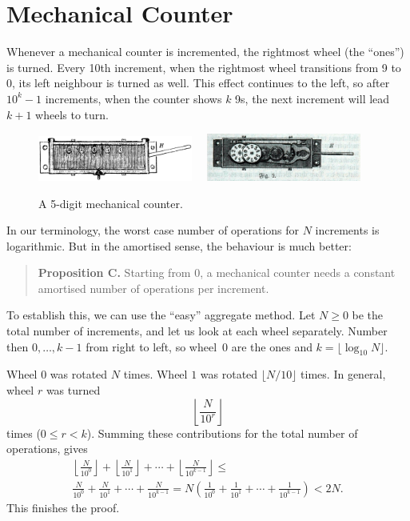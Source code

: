 \documentclass{tufte-handout}
\begin{document}
\section{Mechanical Counter}

Whenever a mechanical counter is incremented, the rightmost wheel (the
``ones'') is turned. Every 10th increment, when the rightmost wheel
transitions from 9 to 0, its left neighbour is turned as well. This
effect continues to the left, so after $10^k-1$ increments, when the
counter shows $k$ 9s, the next increment will lead $k+1$ wheels to
turn.

\begin{figure}[htb]
\centerline{\includegraphics[width=2in]{Zaehlwerk_Schema_1.jpg}
$\quad$\includegraphics[width=2in]{Zaehlwerk_Schema_2.jpg}}
\caption{A 5-digit mechanical counter.}
\end{figure}

In our terminology, the worst case number of operations for $N$
increments is logarithmic. But in the amortised sense, the behaviour
is much better:

\begin{quote}
  {\bf Proposition C.}  Starting from 0, a mechanical counter needs a
  constant amortised number of operations per increment.
\end{quote}

To establish this, we can use the ``easy'' aggregate method. Let
$N\geq 0$
be the total number of increments, and let us look at each wheel
separately. Number then $0,\ldots, k-1$ from right to left, so wheel~$0$
are the ones and $k=\lfloor \log_{10} N\rfloor$.

Wheel $0$ was rotated $N$ times. Wheel $1$ was rotated $\lfloor
N/10\rfloor$ times. In general, wheel $r$ was turned \[ \left \lfloor
\frac{N}{10^r} \right\rfloor\] times ($0\leq r < k$). Summing these
contributions for the total number of operations, gives 
\begin{multline*}
 \left \lfloor
\frac{N}{10^0} \right\rfloor +
 \left \lfloor
\frac{N}{10^1} \right\rfloor +
\cdots +
 \left \lfloor
\frac{N}{10^{k-1}} \right\rfloor
\leq \\
\frac{N}{10^0} +
\frac{N}{10^1} +
\cdots +
\frac{N}{10^{k-1}} 
=
N\left(\frac{1}{10^0}+\frac{1}{10^1}+\cdots+\frac{1}{10^{k-1}} \right)
< 2N.
\end{multline*}
This finishes the proof.
\end{document}
